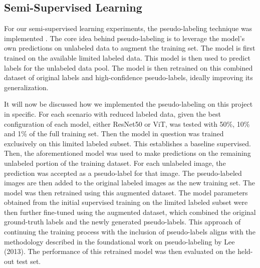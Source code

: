 \documentclass{article}
\begin{document}

\subsection{Semi-Supervised Learning}
For our semi-supervised learning experiments, the pseudo-labeling technique was implemented \cite{lee2013pseudo}. The core idea behind  pseudo-labeling is to leverage the model's own predictions on unlabeled data to augment the training set. The model is first trained on the available limited labeled data. This model is then used to predict labels for the unlabeled data pool. The model is then retrained on this combined dataset of original labels and high-confidence pseudo-labels, ideally improving its generalization. 

It will now be discussed how we implemented the pseudo-labeling on this project in specific. For each scenario with reduced labeled data, given the best configuration of each model, either ResNet50 or ViT, was tested with 50\%, 10\% and 1\% of the full training set. Then the model in question was trained exclusively on this limited labeled subset. This establishes a baseline supervised. Then, the aforementioned model was used to make predictions on the remaining unlabeled portion of the training dataset. For each unlabeled image, the prediction was accepted as a pseudo-label for that image. The pseudo-labeled images are then added to the original labeled images as the new training set. The model was then retrained using this augmented dataset. The model parameters obtained from the initial supervised training on the limited labeled subset were then further fine-tuned using the augmented dataset, which combined the original ground-truth labels and the newly generated pseudo-labels. This approach of continuing the training process with the inclusion of pseudo-labels aligns with the methodology described in the foundational work on pseudo-labeling by Lee (2013)\cite{lee2013pseudo}. The performance of this retrained model was then evaluated on the held-out test set.  
\end{document}
